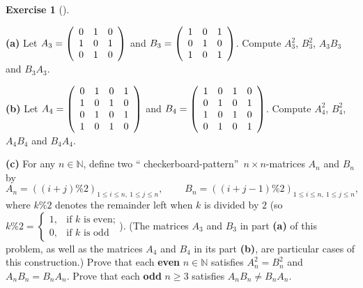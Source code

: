 \documentclass[numbers=enddot,12pt,final,onecolumn,notitlepage]{scrartcl}%
\theoremstyle{definition}
\newtheorem{exmp}[theo]{Exercise}
\newenvironment{exercise}[1][]
{\begin{exmp}[#1]\begin{leftbar}}
{\end{leftbar}\end{exmp}}
\begin{document}
\begin{exercise}
\label{exe.some-products.mt1p}\textbf{(a)} Let $A_{3}=\left(
\begin{array}
[c]{ccc}%
0 & 1 & 0\\
1 & 0 & 1\\
0 & 1 & 0
\end{array}
\right)  $ and $B_{3}=\left(
\begin{array}
[c]{ccc}%
1 & 0 & 1\\
0 & 1 & 0\\
1 & 0 & 1
\end{array}
\right)  $. Compute $A_{3}^{2}$, $B_{3}^{2}$, $A_{3}B_{3}$ and $B_{3}A_{3}$.

\textbf{(b)} Let $A_{4}=\left(
\begin{array}
[c]{cccc}%
0 & 1 & 0 & 1\\
1 & 0 & 1 & 0\\
0 & 1 & 0 & 1\\
1 & 0 & 1 & 0
\end{array}
\right)  $ and $B_{4}=\left(
\begin{array}
[c]{cccc}%
1 & 0 & 1 & 0\\
0 & 1 & 0 & 1\\
1 & 0 & 1 & 0\\
0 & 1 & 0 & 1
\end{array}
\right)  $. Compute $A_{4}^{2}$, $B_{4}^{2}$, $A_{4}B_{4}$ and $B_{4}A_{4}$.

\textbf{(c)} For any $n\in\mathbb{N}$, define two \textquotedblleft
checkerboard-pattern\textquotedblright\ $n\times n$-matrices $A_{n}$ and
$B_{n}$ by%
\[
A_{n}=\left(  \left(  i+j\right)  \%2\right)  _{1\leq i\leq n,\ 1\leq j\leq
n},\ \ \ \ \ \ \ \ \ \ B_{n}=\left(  \left(  i+j-1\right)  \%2\right)  _{1\leq
i\leq n,\ 1\leq j\leq n},
\]
where $k\%2$ denotes the remainder left when $k$ is divided by $2$ (so $k\%2=%
\begin{cases}
1, & \text{if }k\text{ is even;}\\
0, & \text{if }k\text{ is odd}%
\end{cases}
$). (The matrices $A_{3}$ and $B_{3}$ in part \textbf{(a)} of this problem, as
well as the matrices $A_{4}$ and $B_{4}$ in its part \textbf{(b)}, are
particular cases of this construction.) Prove that each \textbf{even}
$n\in\mathbb{N}$ satisfies $A_{n}^{2}=B_{n}^{2}$ and $A_{n}B_{n}=B_{n}A_{n}$.
Prove that each \textbf{odd} $n\geq3$ satisfies $A_{n}B_{n}\neq B_{n}A_{n}$.
\end{exercise}
\end{document}
